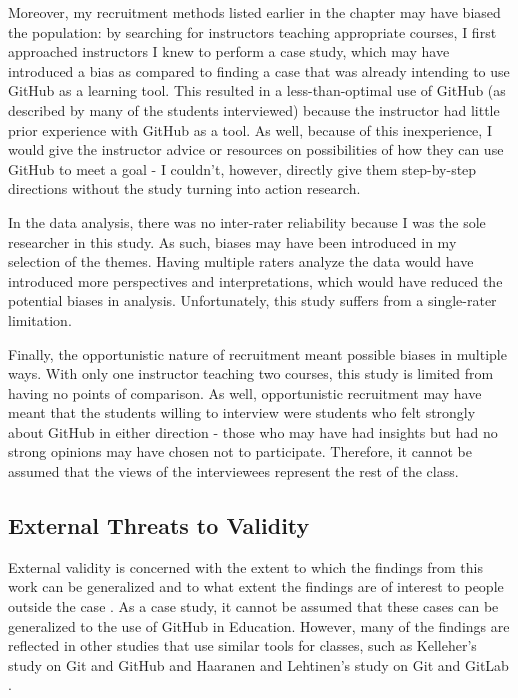 Moreover, my recruitment methods listed earlier in the chapter may have biased the population: by searching for instructors teaching appropriate courses, I first approached instructors I knew to perform a case study, which may have introduced a bias as compared to finding a case that was already intending to use GitHub as a learning tool. This resulted in a less-than-optimal use of GitHub (as described by many of the students interviewed) because the instructor had little prior experience with GitHub as a tool. As well, because of this inexperience, I would give the instructor advice or resources on possibilities of how they can use GitHub to meet a goal - I couldn't, however, directly give them step-by-step directions without the study turning into action research.

In the data analysis, there was no inter-rater reliability because I was the sole researcher in this study. As such, biases may have been introduced in my selection of the themes. Having multiple raters analyze the data would have introduced more perspectives and interpretations, which would have reduced the potential biases in analysis. Unfortunately, this study suffers from a single-rater limitation.

Finally, the opportunistic nature of recruitment meant possible biases in multiple ways. With only one instructor teaching two courses, this study is limited from having no points of comparison. As well, opportunistic recruitment may have meant that the students willing to interview were students who felt strongly about GitHub in either direction - those who may have had insights but had no strong opinions may have chosen not to participate. Therefore, it cannot be assumed that the views of the interviewees represent the rest of the class.

\subsection{External Threats to Validity}
External validity is concerned with the extent to which the findings from this work can be generalized and to what extent the findings are of interest to people outside the case \cite{runeson2012case}. As a case study, it cannot be assumed that these cases can be generalized to the use of GitHub in Education. However, many of the findings are reflected in other studies that use similar tools for classes, such as Kelleher's study on Git and GitHub \cite{kelleher2014employing} and Haaranen and Lehtinen's study on Git and GitLab \cite{haaranen2015teaching}. %
